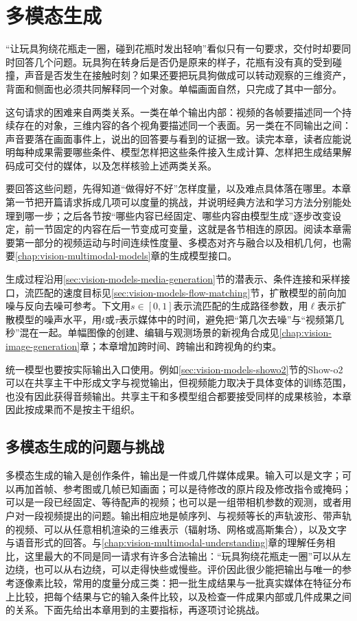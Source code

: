 \chapter{多模态生成}
\label{chap:vision-multimodal-generation}

“让玩具狗绕花瓶走一圈，碰到花瓶时发出轻响”看似只有一句要求，交付时却要同时回答几个问题。玩具狗在转身后是否仍是原来的样子，花瓶有没有真的受到碰撞，声音是否发生在接触时刻？如果还要把玩具狗做成可以转动观察的三维资产，背面和侧面也必须共同解释同一个对象。单幅画面自然，只完成了其中一部分。

这句请求的困难来自两类关系。一类在单个输出内部：视频的各帧要描述同一个持续存在的对象，三维内容的各个视角要描述同一个表面。另一类在不同输出之间：声音要落在画面事件上，说出的回答要与看到的证据一致。读完本章，读者应能说明每种成果需要哪些条件、模型怎样把这些条件接入生成计算、怎样把生成结果解码成可交付的媒体，以及怎样核验上述两类关系。

要回答这些问题，先得知道“做得好不好”怎样度量，以及难点具体落在哪里。本章第一节把开篇请求拆成几项可以度量的挑战，并说明经典方法和学习方法分别能处理到哪一步；之后各节按“哪些内容已经固定、哪些内容由模型生成”逐步改变设定，前一节固定的内容在后一节变成可变量，这就是各节相连的原因。阅读本章需要第一部分的视频运动与时间连续性度量、多模态对齐与融合以及相机几何，也需要\ref{chap:vision-multimodal-models}章的生成模型接口。

生成过程沿用\ref{sec:vision-models-media-generation}节的潜表示、条件连接和采样接口，流匹配的速度目标见\ref{sec:vision-models-flow-matching}节，扩散模型的前向加噪与反向去噪可参考。下文用$s\in[0,1]$表示流匹配的生成路径参数，用$\ell$表示扩散模型的噪声水平，用$t$或$\tau$表示媒体中的时间，避免把“第几次去噪”与“视频第几秒”混在一起。单幅图像的创建、编辑与观测场景的新视角合成见\ref{chap:vision-image-generation}章；本章增加跨时间、跨输出和跨视角的约束。

统一模型也要按实际输出入口使用。例如\ref{sec:vision-models-showo2}节的Show-o2可以在共享主干中形成文字与视觉输出，但视频能力取决于具体变体的训练范围，也没有因此获得音频输出。共享主干和多模型组合都要接受同样的成果核验，本章因此按成果而不是按主干组织。

\section{多模态生成的问题与挑战}
\label{sec:vision-multigen-challenges}

多模态生成的输入是创作条件，输出是一件或几件媒体成果。输入可以是文字；可以再加首帧、参考图或几帧已知画面；可以是待修改的原片段及修改指令或掩码；可以是一段已经固定、等待配声的视频；也可以是一组带相机参数的观测，或者用户对一段视频提出的问题。输出相应地是帧序列、与视频等长的声轨波形、带声轨的视频、可以从任意相机渲染的三维表示（辐射场、网格或高斯集合），以及文字与语音形式的回答。与\ref{chap:vision-multimodal-understanding}章的理解任务相比，这里最大的不同是同一请求有许多合法输出：“玩具狗绕花瓶走一圈”可以从左边绕，也可以从右边绕，可以走得快些或慢些。评价因此很少能把输出与唯一的参考逐像素比较，常用的度量分成三类：把一批生成结果与一批真实媒体在特征分布上比较，把每个结果与它的输入条件比较，以及检查一件成果内部或几件成果之间的关系。下面先给出本章用到的主要指标，再逐项讨论挑战。


